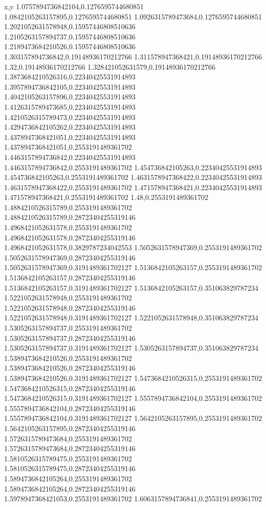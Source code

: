x,y
1.0757894736842104,0.1276595744680851
1.0842105263157895,0.1276595744680851
1.0926315789473684,0.1276595744680851
1.2021052631578948,0.15957446808510636
1.2105263157894737,0.15957446808510636
1.2189473684210526,0.15957446808510636
1.303157894736842,0.19148936170212766
1.311578947368421,0.19148936170212766
1.32,0.19148936170212766
1.328421052631579,0.19148936170212766
1.3873684210526316,0.22340425531914893
1.3957894736842105,0.22340425531914893
1.4042105263157896,0.22340425531914893
1.4126315789473685,0.22340425531914893
1.4210526315789473,0.22340425531914893
1.4294736842105262,0.22340425531914893
1.4378947368421051,0.22340425531914893
1.4378947368421051,0.2553191489361702
1.4463157894736842,0.22340425531914893
1.4463157894736842,0.2553191489361702
1.454736842105263,0.22340425531914893
1.454736842105263,0.2553191489361702
1.4631578947368422,0.22340425531914893
1.4631578947368422,0.2553191489361702
1.471578947368421,0.22340425531914893
1.471578947368421,0.2553191489361702
1.48,0.2553191489361702
1.4884210526315789,0.2553191489361702
1.4884210526315789,0.28723404255319146
1.4968421052631578,0.2553191489361702
1.4968421052631578,0.28723404255319146
1.4968421052631578,0.3829787234042553
1.5052631578947369,0.2553191489361702
1.5052631578947369,0.28723404255319146
1.5052631578947369,0.3191489361702127
1.5136842105263157,0.2553191489361702
1.5136842105263157,0.28723404255319146
1.5136842105263157,0.3191489361702127
1.5136842105263157,0.351063829787234
1.5221052631578948,0.2553191489361702
1.5221052631578948,0.28723404255319146
1.5221052631578948,0.3191489361702127
1.5221052631578948,0.351063829787234
1.5305263157894737,0.2553191489361702
1.5305263157894737,0.28723404255319146
1.5305263157894737,0.3191489361702127
1.5305263157894737,0.351063829787234
1.5389473684210526,0.2553191489361702
1.5389473684210526,0.28723404255319146
1.5389473684210526,0.3191489361702127
1.5473684210526315,0.2553191489361702
1.5473684210526315,0.28723404255319146
1.5473684210526315,0.3191489361702127
1.5557894736842104,0.2553191489361702
1.5557894736842104,0.28723404255319146
1.5557894736842104,0.3191489361702127
1.5642105263157895,0.2553191489361702
1.5642105263157895,0.28723404255319146
1.5726315789473684,0.2553191489361702
1.5726315789473684,0.28723404255319146
1.5810526315789475,0.2553191489361702
1.5810526315789475,0.28723404255319146
1.5894736842105264,0.2553191489361702
1.5894736842105264,0.28723404255319146
1.5978947368421053,0.2553191489361702
1.6063157894736841,0.2553191489361702
